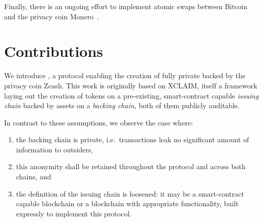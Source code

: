 Finally, there is an ongoing effort to implement atomic swaps between Bitcoin and the privacy coin Monero~\cite{BTCXMRatomicswaps,CCSMoneroAtomicSwapsimplementationfunding}.


\section{Contributions}

We introduce \zclaim, a protocol enabling the creation of fully private \cbas backed by the privacy coin Zcash.
This work is originally based on XCLAIM, itself a framework laying out the creation of tokens on a pre-existing, smart-contract capable \emph{issuing chain} backed by assets on a \emph{backing chain}, both of them publicly auditable.

In contrast to these assumptions, we observe the case where:
\begin{enumerate}[label=(\alph*)]
  \item the backing chain is private, i.e.\ transactions leak no significant amount of information to outsiders,
  \item this anonymity shall be retained throughout the protocol and across both chains, and
  \item the definition of the issuing chain is loosened: it may be a smart-contract capable blockchain or a blockchain with appropriate functionality, built expressly to implement this protocol.
\end{enumerate}

